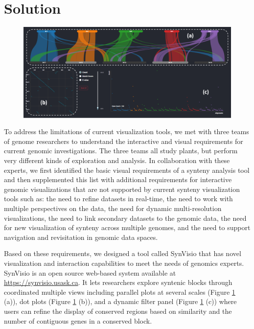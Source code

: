 \section{Solution}

\begin{figure}
  \centering
  \includegraphics[width=1\linewidth]{images/ch_1_dashboard.PNG}
  \label{fig:ch_1_dashboard}
\end{figure}

To address the limitations of current visualization tools, we met with three teams of genome researchers to understand the interactive and visual requirements for current genomic investigations. The three teams all study plants, but perform very different kinds of exploration and analysis. In collaboration with these experts, we first identified the basic visual requirements of a synteny analysis tool and then supplemented  this list with additional requirements for interactive genomic visualizations that are not supported by current synteny visualization tools such as: the need to refine datasets in real-time, the need to work with multiple perspectives on the data, the need for dynamic multi-resolution visualizations, the need to link secondary datasets to the genomic data, the need for new visualization of synteny across multiple genomes, and the need to support navigation and revisitation in genomic data spaces.

Based on these requirements, we designed a tool called SynVisio that has novel visualization and interaction capabilities to meet the needs of genomics experts. SynVisio is an open source web-based system available at \url{https://synvisio.usask.ca}. It lets researchers explore syntenic blocks through coordinated multiple views including parallel plots at several scales (Figure \ref{fig:ch_1_dashboard} (a)), dot plots (Figure \ref{fig:ch_1_dashboard} (b)), and a dynamic filter panel (Figure \ref{fig:ch_1_dashboard} (c)) where users can refine the display of conserved regions based on similarity and the number of contiguous genes in a conserved block.

